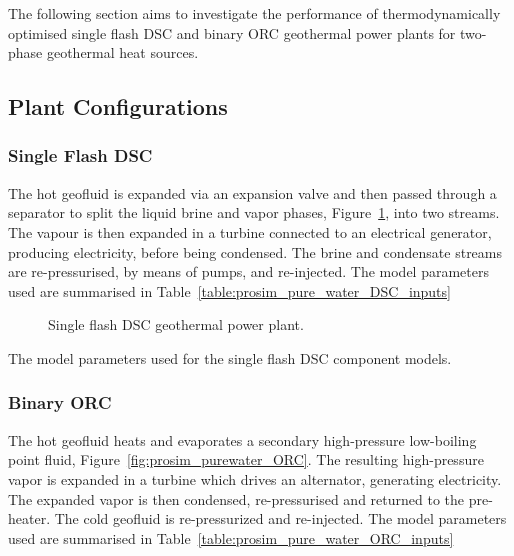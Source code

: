 The following section aims to investigate the performance of thermodynamically optimised single flash \ac{DSC} and binary \ac{ORC} geothermal power plants for two-phase geothermal heat sources.

\subsection{Plant Configurations}
    \label{sec:prosim_plant_configurations}

    \subsubsection{Single Flash DSC}
        \label{sec:thermo_opt_DSC_config}
        The hot geofluid is expanded via an expansion valve and then passed through a separator to split the liquid brine and vapor phases, Figure~\ref{fig:prosim_purewater_DSC}, into two streams. The vapour is then expanded in a turbine connected to an electrical generator, producing electricity, before being condensed. The brine and condensate streams are re-pressurised, by means of pumps, and re-injected. The model parameters used are summarised in Table~\ref{table:prosim_pure_water_DSC_inputs}

        \begin{figure}[H]
            \centering
            
            \caption{Single flash \ac{DSC} geothermal power plant.}
            \label{fig:prosim_purewater_DSC}
        \end{figure}

        \begin{table}[H]
            \centering
            \caption{The model parameters used for the single flash \ac{DSC} component models.}
            \label{table:prosim_pure_water_DSC_inputs}
                    
        \end{table}
    
    \subsubsection{Binary ORC}
        The hot geofluid heats and evaporates a secondary high-pressure low-boiling point fluid, Figure~\ref{fig:prosim_purewater_ORC}. The resulting high-pressure vapor is expanded in a turbine which drives an alternator, generating electricity. The expanded vapor is then condensed, re-pressurised and returned to the pre-heater. The cold geofluid is re-pressurized and re-injected. The model parameters used are summarised in Table~\ref{table:prosim_pure_water_ORC_inputs}

